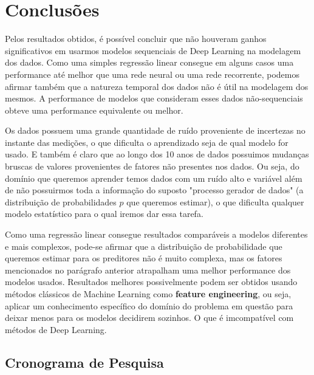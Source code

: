 \chapter{Conclusões}
\label{cap:conclusoes}


Pelos resultados obtidos, é possível concluir que não houveram ganhos
significativos em usarmos modelos sequenciais de Deep Learning na modelagem dos
dados. Como uma simples regressão linear consegue em alguns casos uma
performance até melhor que uma rede neural ou uma rede recorrente, podemos afirmar também que a natureza temporal dos dados não é útil na modelagem dos mesmos. A performance de modelos que consideram esses dados não-sequenciais obteve uma performance equivalente ou melhor.

Os dados possuem uma grande quantidade de ruído proveniente de incertezas no instante das medições, o que dificulta o aprendizado seja de qual modelo for usado. E também é claro que ao longo dos 10 anos de dados possuimos mudanças bruscas de valores provenientes de fatores não presentes nos dados. Ou seja, do domínio que queremos aprender temos dados com um ruído alto e variável além de não possuirmos toda a informação do suposto "processo gerador de dados" (a distribuição de probabilidades $p$ que queremos estimar), o que dificulta qualquer modelo estatístico para o qual iremos dar essa tarefa.

Como uma regressão linear consegue resultados comparáveis a modelos diferentes e mais complexos, pode-se afirmar que a distribuição de probabilidade que queremos estimar para os preditores não é muito complexa, mas os fatores mencionados no parágrafo anterior atrapalham uma melhor performance dos modelos usados. Resultados melhores possivelmente podem ser obtidos usando métodos clássicos de Machine Learning como \textbf{feature engineering}, ou seja, aplicar um conhecimento específico do domínio do problema em questão para deixar menos para os modelos decidirem sozinhos. O que é imcompatível com métodos de Deep Learning. 




\section{Cronograma de Pesquisa}


